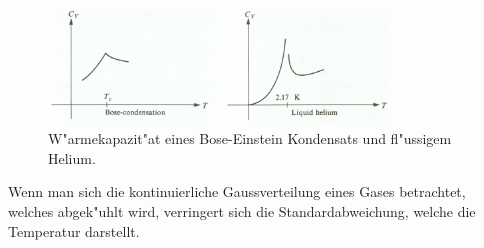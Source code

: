 \begin{refsection}
\begin{figure}
    \centering
    \includegraphics[width = 0.8\textwidth]{./bose/wrmkap.png}
    \caption[W"armekapazit"at eines Bose-Einstein Kondensats und fl"ussigem Helium.]{W"armekapazit"at eines Bose-Einstein Kondensats und fl"ussigem Helium. \cite{bose:feynman}}
    \label{fig:WrmKap}
\end{figure}
Wenn man sich die kontinuierliche Gaussverteilung eines Gases betrachtet, welches abgek"uhlt wird, verringert sich die Standardabweichung, welche die Temperatur darstellt.


\end{refsection}
